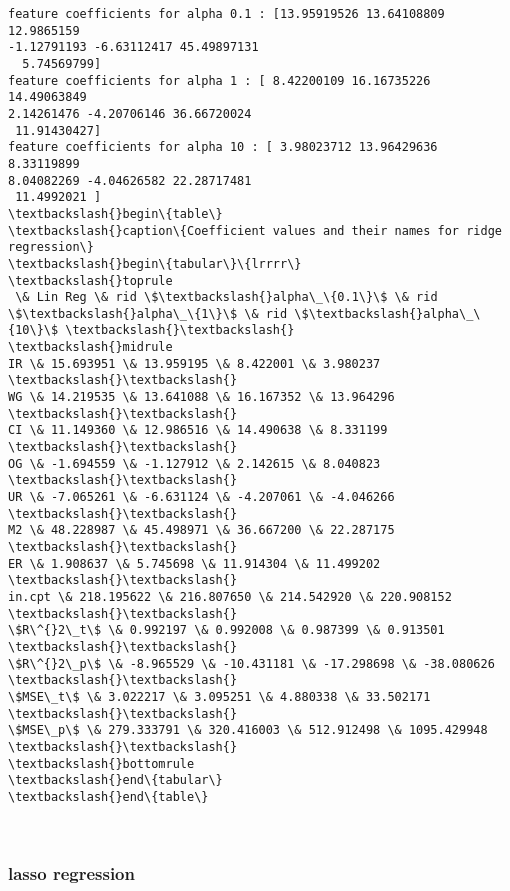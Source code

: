 \documentclass[11pt]{article}
\begin{document}
    \begin{Verbatim}[commandchars=\\\{\}]
feature coefficients for alpha 0.1 : [13.95919526 13.64108809 12.9865159
-1.12791193 -6.63112417 45.49897131
  5.74569799]
feature coefficients for alpha 1 : [ 8.42200109 16.16735226 14.49063849
2.14261476 -4.20706146 36.66720024
 11.91430427]
feature coefficients for alpha 10 : [ 3.98023712 13.96429636  8.33119899
8.04082269 -4.04626582 22.28717481
 11.4992021 ]
\textbackslash{}begin\{table\}
\textbackslash{}caption\{Coefficient values and their names for ridge regression\}
\textbackslash{}begin\{tabular\}\{lrrrr\}
\textbackslash{}toprule
 \& Lin Reg \& rid \$\textbackslash{}alpha\_\{0.1\}\$ \& rid \$\textbackslash{}alpha\_\{1\}\$ \& rid \$\textbackslash{}alpha\_\{10\}\$ \textbackslash{}\textbackslash{}
\textbackslash{}midrule
IR \& 15.693951 \& 13.959195 \& 8.422001 \& 3.980237 \textbackslash{}\textbackslash{}
WG \& 14.219535 \& 13.641088 \& 16.167352 \& 13.964296 \textbackslash{}\textbackslash{}
CI \& 11.149360 \& 12.986516 \& 14.490638 \& 8.331199 \textbackslash{}\textbackslash{}
OG \& -1.694559 \& -1.127912 \& 2.142615 \& 8.040823 \textbackslash{}\textbackslash{}
UR \& -7.065261 \& -6.631124 \& -4.207061 \& -4.046266 \textbackslash{}\textbackslash{}
M2 \& 48.228987 \& 45.498971 \& 36.667200 \& 22.287175 \textbackslash{}\textbackslash{}
ER \& 1.908637 \& 5.745698 \& 11.914304 \& 11.499202 \textbackslash{}\textbackslash{}
in.cpt \& 218.195622 \& 216.807650 \& 214.542920 \& 220.908152 \textbackslash{}\textbackslash{}
\$R\^{}2\_t\$ \& 0.992197 \& 0.992008 \& 0.987399 \& 0.913501 \textbackslash{}\textbackslash{}
\$R\^{}2\_p\$ \& -8.965529 \& -10.431181 \& -17.298698 \& -38.080626 \textbackslash{}\textbackslash{}
\$MSE\_t\$ \& 3.022217 \& 3.095251 \& 4.880338 \& 33.502171 \textbackslash{}\textbackslash{}
\$MSE\_p\$ \& 279.333791 \& 320.416003 \& 512.912498 \& 1095.429948 \textbackslash{}\textbackslash{}
\textbackslash{}bottomrule
\textbackslash{}end\{tabular\}
\textbackslash{}end\{table\}

    \end{Verbatim}

    \begin{center}
    \end{center}
    { \hspace*{\fill} \\}
    
    \subsubsection{lasso regression}\label{lasso-regression}
\end{document}
